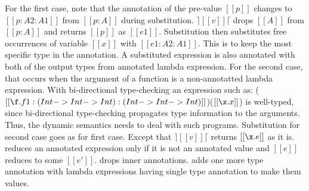 For the first case, note that the annotation of the pre-value
$[[p]]$ changes to $[[p:A2:A1]]$ from $[[p:A]]$ during substitution.
$\rceil[[v]]\lceil$ drops $[[A]]$ from $[[p:A]]$ and returns $[[p]]$ 
as $[[e1]]$. Substitution then
substitutes free occurrences of variable $[[x]]$ with $[[e1:A2:A1]]$.
This is to keep the most specific type in the annotation. A substituted
expression is also annotated with both of the output types from
annotated lambda expression.
For the second case, that occurs when the
argument of a function is a non-annotatted lambda expression.
With bi-directional type-checking an expression such as:
($[[\f.f 1:(Int -> Int -> Int) : (Int -> Int -> Int)]]$)($[[\x.x]]$)
 
is well-typed, since bi-directional type-checking propagates
type information to the arguments. Thus, the dynamic semantics
needs to deal with such programs. Substitution for second case goes
as for first case. Except that $\rceil[[v]]\lceil$ returns $[[\x.e]]$ as it is.
reduces an annotated expression only if it is not an annotated value and $[[e]]$
reduces to some $[[e']]$.  drops inner
annotations.  adds one more type annotation with
lambda expressions having single type annotation to make them values.

\begin{comment}
\Rref{step-beta} deals with a special case, that occurs when the
argument of a function is a non-annotatted lambda expression.
With bi-directional type-checking an expression such as:
($[[\f.f 1:(Int -> Int -> Int) : (Int -> Int -> Int)]]$)($[[\x.x]]$)
\bruno{example here.} \baber{Done.}
is well-typed, since bi-directional type-checking propagates
type information to the arguments. Thus, the dynamic semantics
needs to deal with such programs.
We emphasize the fact that $[[\x.e]]$ is not a value in \cal.
The rule follows the same approach as
\rref{step-beta} except that both of the input types are kept with
$[[\x.e]]$ during substitution i.e $[[\x.e:A2:A1]]$. \Rref{step-ann}
reduces an annotated expression only if it is not a value and $[[e]]$
reduces to some $[[e']]$. \Rref{step-rmann} drops inner
annotations. \Rref{step-lamann} adds one more type annotation with
lambda expressions having single type annotation to make them values.
\end{comment}


